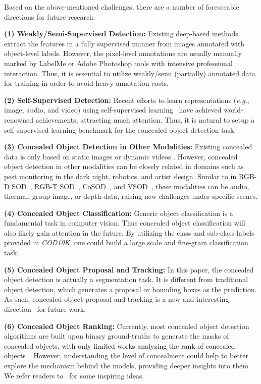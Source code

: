 \documentclass[10pt,journal,compsoc]{IEEEtran}
\def\eg{\emph{e.g.}}
\newcommand{\Rev}[1]{\textcolor{black}{#1}}
\def\ourdataset{\textit{COD10K}}
\begin{document}
Based on the above-mentioned challenges, there are a number of 
foreseeable directions for future research: 

\textbf{(1) Weakly/Semi-Supervised Detection:} 
Existing deep-based methods extract the features in a fully supervised manner 
from images annotated with object-level labels. 
However, the pixel-level annotations are usually manually marked by LabelMe 
or Adobe Photoshop tools with intensive professional interaction. 
Thus, it is essential to utilize weakly/semi (partially) annotated data 
for training in order to avoid heavy annotation costs. 

\textbf{(2) Self-Supervised Detection:} 
Recent efforts to learn representations (\eg, image, audio, and video)  
using self-supervised learning~\cite{afouras2020self,he2020momentum} 
have achieved  world-renowned achievements, attracting much attention. 
Thus, it is natural to setup a self-supervised learning benchmark for the 
concealed object detection task. 

\textbf{(3) Concealed Object Detection in Other Modalities:} 
Existing concealed data is only based on static images or dynamic videos
\cite{lamdouar2020betrayed}. 
However,  concealed object detection in other modalities can  be closely 
related in domains such as pest monitoring in the dark night, robotics, 
and artist design. 
Similar to in RGB-D SOD~\cite{Fan2019D3Net}, 
RGB-T SOD~\cite{zhang2019rgb}, CoSOD~\cite{deng2021re,Fan2021Group}, and VSOD~\cite{fan2019shifting}, 
these modalities can be audio, thermal, group image, or depth data, 
raising new challenges under specific scenes.  

\textbf{(4) Concealed Object Classification:} 
Generic object  classification is a fundamental task in computer vision. 
Thus concealed object classification will also likely gain attention 
in the future. 
By utilizing the class and sub-class labels provided in \ourdataset, 
one could build a large scale and fine-grain classification task. 

\textbf{(5) Concealed Object Proposal and Tracking:} 
In this paper, the concealed object detection is actually a segmentation task. 
It is different from traditional object detection, 
which generates a proposal or bounding boxes as the prediction. 
As such, concealed object proposal and tracking is a new and 
interesting direction~\cite{mondal2020camouflaged} for future work.

\textbf{(6) Concealed Object Ranking:} 
Currently, most concealed object detection algorithms are built upon binary ground-truths to generate the masks of concealed objects, 
\Rev{with only limited works analyzing the rank of concealed objects~\cite{zhai2021Mutual}.} However, understanding the level of concealment could help to better 
explore the mechanism behind the models, providing deeper insights into them. We refer readers to~\cite{kalash2019relative,zhai2021Mutual} for some inspiring ideas.
\end{document}
